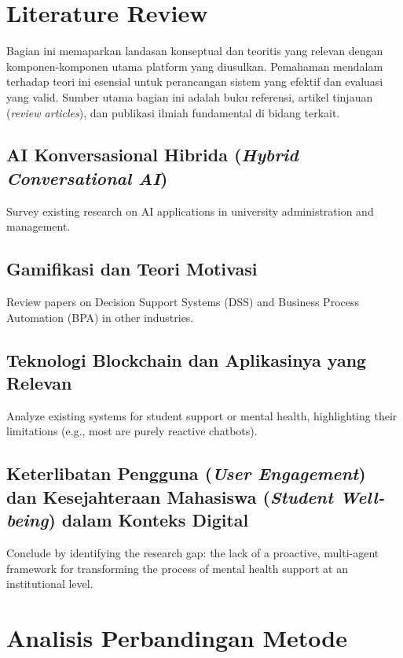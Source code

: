 \section{Literature Review}
\label{sec:literature_review}

Bagian ini memaparkan landasan konseptual dan teoritis yang relevan dengan komponen-komponen utama platform yang diusulkan. Pemahaman mendalam terhadap teori ini esensial untuk perancangan sistem yang efektif dan evaluasi yang valid. Sumber utama bagian ini adalah buku referensi, artikel tinjauan (\textit{review articles}), dan publikasi ilmiah fundamental di bidang terkait.

\subsection{AI Konversasional Hibrida (\textit{Hybrid Conversational AI})}
\label{subsec:teori_ai_detail_revised}
Survey existing research on AI applications in university administration and management.

\subsection{Gamifikasi dan Teori Motivasi}
\label{subsec:teori_gamifikasi_detail_revised}
Review papers on Decision Support Systems (DSS) and Business Process Automation (BPA) in other industries.

\subsection{Teknologi Blockchain dan Aplikasinya yang Relevan}
\label{subsec:teori_blockchain_detail_revised}
Analyze existing systems for student support or mental health, highlighting their limitations (e.g., most are purely reactive chatbots).

\subsection{Keterlibatan Pengguna (\textit{User Engagement}) dan Kesejahteraan Mahasiswa (\textit{Student Well-being}) dalam Konteks Digital}
\label{subsec:teori_engagement_wellbeing_detail_revised}
Conclude by identifying the research gap: the lack of a proactive, multi-agent framework for transforming the process of mental health support at an institutional level.


\section{Analisis Perbandingan Metode}
\label{sec:analisis_metode_revised}

